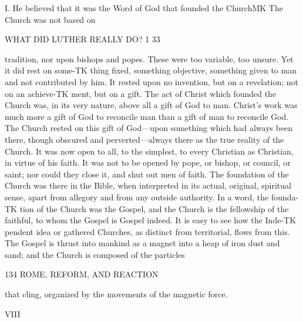 \documentclass[12pt,a5paper,twoside]{book}
\begin{document}
I. He believed that it was the Word of God that 
founded the ChurchMK The Church was not based on 



WHAT DID LUTHER REALLY DO? 1 33 

tradition, nor upon bishops and popes. These were 
too variable, too unsure. Yet it did rest on some-TK
thing fixed, something objective, something given to 
man and not contributed by him. It rested upon no 
invention, but on a revelation; not on an achieve-TK
ment, but on a gift. The act of Christ which 
founded the Church was, in its very nature, above all 
a gift of God to man. Christ's work was much more 
a gift of God to reconcile man than a gift of man to 
reconcile God. The Church rested on this gift of 
God---upon something which had always been there, 
though obscured and perverted---always there as the 
true reality of the Church. It was now open to all, to 
the simplest, to every Christian as Christian, in virtue 
of his faith. It was not to be opened by pope, or 
bishop, or council, or saint; nor could they close it, 
and shut out men of faith. The foundation of the 
Church was there in the Bible, when interpreted in its 
actual, original, spiritual sense, apart from allegory and 
from any outside authority. In a word, the founda-TK
tion of the Church was the Gospel, and the Church 
is the fellowship of the faithful, to whom the Gospel 
is Gospel indeed. It is easy to see how the Inde-TK
pendent idea or gathered Churches, as distinct from 
territorial, flows from this. The Gospel is thrust into 
mankind as a magnet into a heap of iron dust and 
sand; and the Church is composed of the particles 



134 ROME, REFORM, AND REACTION 

that cling, organized by the movements of the magnetic 
force. 

VIII 
\end{document}
